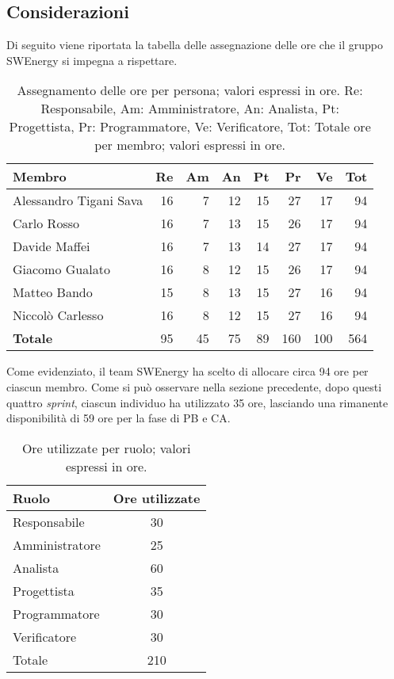 \subsection{Considerazioni}
Di seguito viene riportata la tabella delle assegnazione delle ore che il gruppo SWEnergy si impegna a rispettare.

\begin{table}[H]
	\renewcommand{\arraystretch}{1.5}
	\centering
	\begin{tabular}{l|r|r|r|r|r|r|r}
		\textbf{Membro} & \textbf{Re} & \textbf{Am} & \textbf{An} & \textbf{Pt}
		& \textbf{Pr} & \textbf{Ve} & \textbf{Tot} \\
		\hline
		Alessandro Tigani Sava 	&	16 &  7 & 12 & 15 &  27 &  17 &  94 \\
		Carlo Rosso 			&	16 &  7 & 13 & 15 &  26 &  17 &  94 \\
		Davide Maffei			&	16 &  7 & 13 & 14 &  27 &  17 &  94 \\
		Giacomo Gualato 		&	16 &  8 & 12 & 15 &  26 &  17 &  94 \\
		Matteo Bando 			&	15 &  8 & 13 & 15 &  27 &  16 &  94	\\
		Niccolò Carlesso 		&	16 &  8 & 12 & 15 &  27 &  16 &  94 \\
		\hline
		\textbf{Totale} 		&	95 & 45 & 75 & 89 & 160 & 100 & 564 \\
	\end{tabular}

	\caption{Assegnamento delle ore per persona; valori espressi in ore.
		Re: Responsabile, Am: Amministratore, An: Analista, Pt:
	Progettista, Pr: Programmatore, Ve: Verificatore, Tot: Totale ore per 
	membro; valori espressi in ore.}
\end{table}

Come evidenziato, il team SWEnergy ha scelto di allocare circa 94 ore per ciascun membro. Come si può osservare nella sezione precedente, dopo questi quattro \textit{sprint}, ciascun 
individuo ha utilizzato 35 ore, lasciando una rimanente disponibilità di 59 ore per la fase di PB e CA.


\begin{table}[H]
	\centering
	\begin{tabular}{l|c}
		\textbf{Ruolo}         & \textbf{Ore utilizzate} \\
		\hline
		Responsabile            & 30            \\
		Amministratore          & 25            \\
		Analista                & 60            \\
		Progettista             & 35            \\
		Programmatore           & 30            \\
		Verificatore            & 30            \\
		\hline
		Totale				  & 210           \\
	\end{tabular}
	\caption{Ore utilizzate per ruolo; valori espressi in ore.}  
\end{table}

